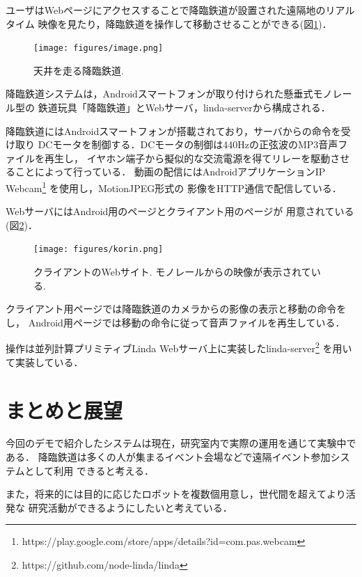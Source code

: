 \documentclass[submit,techreq]{ipsj}
\begin{document}
ユーザはWebページにアクセスすることで降臨鉄道が設置された遠隔地のリアルタイム
映像を見たり，降臨鉄道を操作して移動させることができる(図\ref{monorail})．

\begin{figure}[H]
\begin{center}
\texttt{[image: figures/image.png]}
\end{center}
\caption{天井を走る降臨鉄道.}
\label{monorail}
\end{figure}


降臨鉄道システムは，Androidスマートフォンが取り付けられた懸垂式モノレール型の
鉄道玩具「降臨鉄道」とWebサーバ，linda-serverから構成される．

降臨鉄道にはAndroidスマートフォンが搭載されており，サーバからの命令を受け取り
DCモータを制御する．DCモータの制御は440Hzの正弦波のMP3音声ファイルを再生し，
イヤホン端子から擬似的な交流電源を得てリレーを駆動させることによって行っている．
動画の配信にはAndroidアプリケーションIP Webcam\footnote{
  \textsf{https://play.google.com/store/apps/details?id=com.pas.webcam}
}
を使用し，MotionJPEG形式の
影像をHTTP通信で配信している．

WebサーバにはAndroid用のページとクライアント用のページが
用意されている(図\ref{browser})．

\begin{figure}[H]
\begin{center}
\texttt{[image: figures/korin.png]}
\end{center}
\caption{クライアントのWebサイト. モノレールからの映像が表示されている.}
\label{browser}
\end{figure}

クライアント用ページでは降臨鉄道のカメラからの影像の表示と移動の命令をし，
Android用ページでは移動の命令に従って音声ファイルを再生している．

操作は並列計算プリミティブLinda\cite{Carriero:1989:LC:63334.63337}
Webサーバ上に実装したlinda-server\footnote{
  \textsf{https://github.com/node-linda/linda}
}
を用いて実装している．

\section{まとめと展望}

今回のデモで紹介したシステムは現在，研究室内で実際の運用を通じて実験中である．
降臨鉄道は多くの人が集まるイベント会場などで遠隔イベント参加システムとして利用
できると考える．

また，将来的には目的に応じたロボットを複数個用意し，世代間を超えてより活発な
研究活動ができるようにしたいと考えている．




\end{document}

